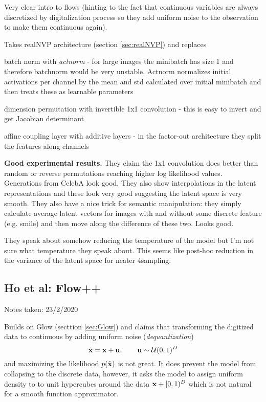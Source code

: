Very clear intro to flows (hinting to the fact that continuous variables are always discretized by digitalization process so they add uniform noise to the observation to make them continuous again).

Takes realNVP architecture (section \ref{sec:realNVP}) and replaces 
\begin{compactitem}
\item batch norm with \emph{actnorm} - for large images the minibatch has size 1 and therefore batchnorm would be very unstable. Actnorm normalizes initial activations per channel by the mean and std calculated over initial minibatch and then treats these as learnable parameters
\item dimension permutation with invertible 1x1 convolution - this is easy to invert and get Jacobian determinant
\item affine coupling layer with additive layers - in the factor-out architecture they split the features along channels
\end{compactitem}

\textbf{Good experimental results.} They claim the 1x1 convolution does better than random or reverse permutations reaching higher log likelihood values. Generations from CelebA look good.
They also show interpolations in the latent representations and these look very good suggesting the latent space is very smooth. 
They also have a nice trick for semantic manipulation: they simply calculate average latent vectors for images with and without some discrete feature (e.g. smile) and then move along the difference of these two. Looks good.

They speak about somehow reducing the temperature of the model but I'm not sure what temperature they speak about. This seems like post-hoc reduction in the variance of the latent space for neater 4sampling.


\subsection{Ho et al: Flow++}\label{sec:flow++}

\begin{notebox}

\hfill Notes taken: 23/2/2020 
\end{notebox}

Builds on Glow (secttion \ref{sec:Glow}) and claims that transforming the digitized data to continuous by adding uniform noise (\emph{dequantization})
\begin{equation}
\tilde{\mathbf{x}} = \mathbf{x} + \mathbf{u}, \qquad \mathbf{u} \sim \mathcal{U}(0, 1)^D
\end{equation}
and maximizing the likelihood $p(\tilde{\mathbf{x}})$ is not great.
It does prevent the model from collapsing to the discrete data, however, it asks the model to assign uniform density to to unit hypercubes around the data $\mathbf{x} + [0, 1)^D$ which is not natural for a smooth function approximator.

